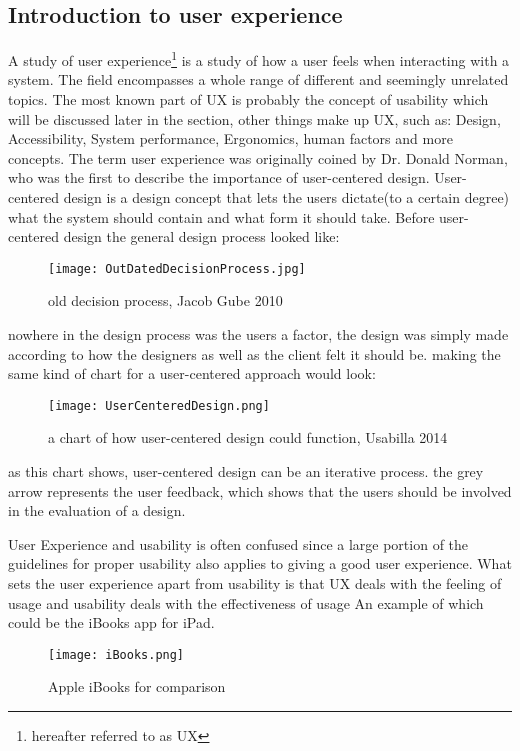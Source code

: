 \subsection{Introduction to user experience }\label{UXIntro}
A study of user experience\footnote{hereafter referred to as UX} is a study of how a user feels when interacting with a system. The field encompasses a whole range of different and seemingly unrelated topics. The most known part of UX is probably the concept of usability which will be discussed later in the section, other things make up UX, such as: Design, Accessibility, System performance, Ergonomics, human factors and more concepts\cite{UXIntro}. The term user experience  was originally coined by Dr. Donald Norman, who was the first to describe the importance of user-centered design. User-centered design is a design concept that lets the users dictate(to a certain degree) what the system should contain and what form it should take.
Before user-centered design the general design process looked like:
\begin{figure}[H]
\centering
\texttt{[image: OutDatedDecisionProcess.jpg]}
\caption{old decision process, Jacob Gube 2010}
\end{figure}
nowhere in the design process was the users a factor, the design was simply made according to how the designers as well as the client felt it should be. making the same kind of chart for a user-centered approach would look:\\
\begin{figure}[H]
\centering
\texttt{[image: UserCenteredDesign.png]}
\caption{a chart of how user-centered design could function, Usabilla 2014}
\end{figure}
as this chart shows, user-centered design can be an iterative process. the grey arrow represents the user feedback, which shows that the users should be involved in the evaluation of a design.

User Experience and usability is often confused since a large portion of the guidelines for proper usability also applies to giving a good user experience. What sets the user experience apart from usability is that UX deals with the feeling of usage and usability deals with the effectiveness of usage
An example of which could be the iBooks app for iPad.
\begin{figure}[H]
\centering
\texttt{[image: iBooks.png]}
\caption{Apple iBooks for comparison}
\end{figure}

